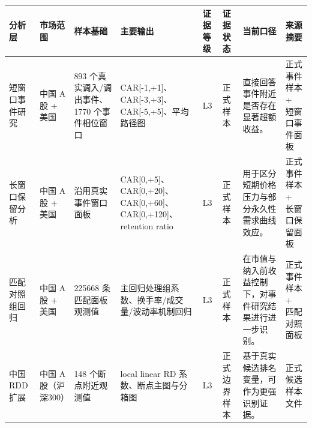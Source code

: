 \begin{tabular}{llllllll}
\toprule
分析层 & 市场范围 & 样本基础 & 主要输出 & 证据等级 & 证据状态 & 当前口径 & 来源摘要 \\
\midrule
短窗口事件研究 & 中国 A 股 + 美国 & 893 个真实调入/调出事件、1770 个事件相位窗口 & CAR[-1,+1]、CAR[-3,+3]、CAR[-5,+5]、平均路径图 & L3 & 正式样本 & 直接回答事件附近是否存在显著超额收益。 & 正式事件样本 + 短窗口事件面板 \\
长窗口保留分析 & 中国 A 股 + 美国 & 沿用真实事件窗口面板 & CAR[0,+5]、CAR[0,+20]、CAR[0,+60]、CAR[0,+120]、retention ratio & L3 & 正式样本 & 用于区分短期价格压力与部分永久性需求曲线效应。 & 正式事件样本 + 长窗口保留面板 \\
匹配对照组回归 & 中国 A 股 + 美国 & 225668 条匹配面板观测值 & 主回归处理组系数、换手率/成交量/波动率机制回归 & L3 & 正式样本 & 在市值与纳入前收益控制下，对事件研究结果进行进一步识别。 & 正式事件样本 + 匹配对照面板 \\
中国 RDD 扩展 & 中国 A 股（沪深300） & 148 个断点附近观测值 & local linear RD 系数、断点主图与分箱图 & L3 & 正式边界样本 & 基于真实候选排名变量，可作为更强识别证据。 & 正式候选样本文件 \\
\bottomrule
\end{tabular}
